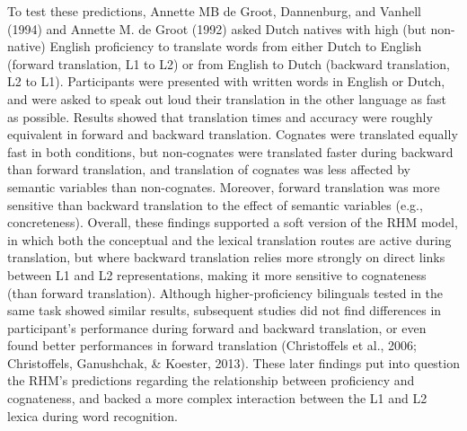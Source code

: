 \documentclass[
  english,
  man,floatsintext]{apa6}
\begin{document}
To test these predictions, Annette MB de Groot, Dannenburg, and Vanhell (1994) and Annette M. de Groot (1992) asked Dutch natives with high (but non-native) English proficiency to translate words from either Dutch to English (forward translation, L1 to L2) or from English to Dutch (backward translation, L2 to L1). Participants were presented with written words in English or Dutch, and were asked to speak out loud their translation in the other language as fast as possible. Results showed that translation times and accuracy were roughly equivalent in forward and backward translation. Cognates were translated equally fast in both conditions, but non-cognates were translated faster during backward than forward translation, and translation of cognates was less affected by semantic variables than non-cognates. Moreover, forward translation was more sensitive than backward translation to the effect of semantic variables (e.g., concreteness). Overall, these findings supported a soft version of the RHM model, in which both the conceptual and the lexical translation routes are active during translation, but where backward translation relies more strongly on direct links between L1 and L2 representations, making it more sensitive to cognateness (than forward translation). Although higher-proficiency bilinguals tested in the same task showed similar results, subsequent studies did not find differences in participant's performance during forward and backward translation, or even found better performances in forward translation (Christoffels et al., 2006; Christoffels, Ganushchak, \& Koester, 2013). These later findings put into question the RHM's predictions regarding the relationship between proficiency and cognateness, and backed a more complex interaction between the L1 and L2 lexica during word recognition.
\end{document}
